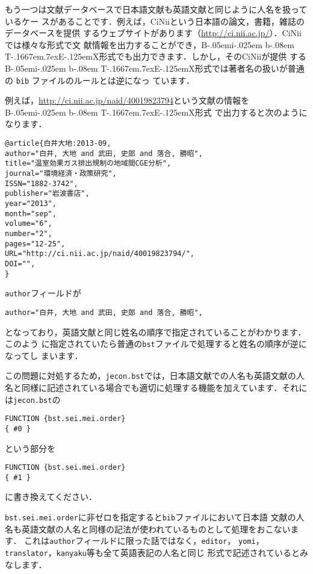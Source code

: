 \documentclass[a4j,10pt]{jarticle}
\def\BibTeX{{\rm B\kern-.05em{\sc i\kern-.025em b}\kern-.08em
    T\kern-.1667em\lower.7ex\hbox{E}\kern-.125emX}}
\begin{document}
もう一つは文献データベースで日本語文献も英語文献と同じように人名を扱っているケー
スがあることです．例えば，CiNiiという日本語の論文，書籍，雑誌のデータベースを提供
するウェブサイトがあります（\url{http://ci.nii.ac.jp/}）．CiNiiでは様々な形式で文
献情報を出力することができ，\BibTeX 形式でも出力できます．しかし，そのCiNiiが提供
する \BibTeX 形式では著者名の扱いが普通の \texttt{bib} ファイルのルールとは逆になっ
ています．

例えば，\url{http://ci.nii.ac.jp/naid/40019823794}という文献の情報を \BibTeX 形式
で出力すると次のようになります．
\begin{screen}
\begin{verbatim}
@article{白井大地:2013-09,
author="白井, 大地 and 武田, 史郎 and 落合, 勝昭",
title="温室効果ガス排出規制の地域間CGE分析",
journal="環境経済・政策研究",
ISSN="1882-3742",
publisher="岩波書店",
year="2013",
month="sep",
volume="6",
number="2",
pages="12-25",
URL="http://ci.nii.ac.jp/naid/40019823794/",
DOI="",
}
\end{verbatim}
\end{screen}
\texttt{author}フィールドが
\begin{screen}
\begin{verbatim}
author="白井, 大地 and 武田, 史郎 and 落合, 勝昭",
\end{verbatim}
\end{screen}
となっており，英語文献と同じ姓名の順序で指定されていることがわかります．このよう
に指定されていたら普通の\texttt{bst}ファイルで処理すると姓名の順序が逆になってし
まいます．

この問題に対処するため，\texttt{jecon.bst}では，日本語文献での人名も英語文献の人
名と同様に記述されている場合でも適切に処理する機能を加えています．それに
は\texttt{jecon.bst}の
\begin{screen}
\begin{verbatim}
FUNCTION {bst.sei.mei.order}
{ #0 }
\end{verbatim}
\end{screen}
という部分を
\begin{screen}
\begin{verbatim}
FUNCTION {bst.sei.mei.order}
{ #1 }
\end{verbatim}
\end{screen}
に書き換えてください．

\texttt{bst.sei.mei.order}に非ゼロを指定すると\texttt{bib}ファイルにおいて日本語
文献の人名も英語文献の人名と同様の記法が使われているものとして処理をおこないます．
これは\texttt{author}フィールドに限った話ではなく，\texttt{editor}，
\texttt{yomi}，\texttt{translator}，\texttt{kanyaku}等も全て英語表記の人名と同じ
形式で記述されているとみなします．
\end{document}
